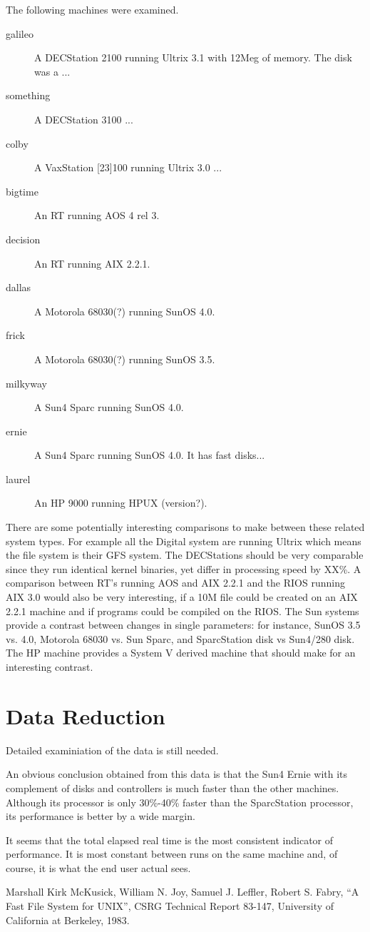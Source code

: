The following machines were examined.
\begin{description}
\item[galileo] A DECStation 2100 running Ultrix 3.1 with 12Meg of memory.  The disk was a ...
\item[something] A DECStation 3100 ...
\item[colby] A VaxStation [23]100 running Ultrix 3.0 ...
\item[bigtime] An RT running AOS 4 rel 3.
\item[decision] An RT running AIX 2.2.1.
\item[dallas] A Motorola 68030(?) running SunOS 4.0.
\item[frick] A Motorola 68030(?) running SunOS 3.5.
\item[milkyway] A Sun4 Sparc running SunOS 4.0.
\item[ernie] A Sun4 Sparc running SunOS 4.0.  It has fast disks...
\item[laurel] An HP 9000 running HPUX (version?).
\end{description}

There are some potentially interesting comparisons to make between these
related system types.  For example all the Digital system are running
Ultrix which means the file system is their GFS system.  The DECStations
should be very comparable since they run identical kernel binaries, yet
differ in processing speed by XX\%.  A comparison between RT's running
AOS and AIX 2.2.1 and the RIOS running AIX 3.0 would also be very
interesting, if a 10M file could be created on an AIX 2.2.1 machine and
if programs could be compiled on the RIOS.  The Sun systems provide a
contrast between changes in single parameters: for instance, SunOS 3.5
vs. 4.0, Motorola 68030 vs. Sun Sparc, and SparcStation disk vs Sun4/280
disk.  The HP machine provides a System V derived machine that should
make for an interesting contrast.

\section{Data Reduction}

Detailed examiniation of the data is still needed.

An obvious conclusion obtained from this data is that the Sun4 Ernie
with its complement of disks and controllers is much faster than the
other machines.  Although its processor is only 30\%-40\% faster than
the SparcStation processor, its performance is better by a wide margin.

It seems that the total elapsed real time is the most consistent
indicator of performance.  It is most constant between runs on the same
machine and, of course, it is what the end user actual sees.

\begin{thebibliography}{99}
 Marshall Kirk McKusick, William N. Joy, Samuel
  J. Leffler, Robert S. Fabry, ``A Fast File System for UNIX'', CSRG
  Technical Report 83-147, University of California at Berkeley, 1983.
\end{thebibliography}



